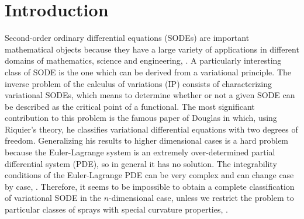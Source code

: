 \documentclass[oneside,english]{amsart}
\numberwithin{equation}{section}
\numberwithin{figure}{section}
\theoremstyle{plain}
\theoremstyle{plain}
\theoremstyle{definition}
\theoremstyle{plain}
\theoremstyle{plain}
\theoremstyle{plain}
\theoremstyle{remark}
\theoremstyle{remark}
\begin{document}
\maketitle


\section{Introduction}


Second-order ordinary differential equations (SODEs) are important
mathematical objects because they have a large variety of applications in
different domains of mathematics, science and engineering, \cite{AIM93}.  A particularly
interesting class of SODE is the one which can be derived from a variational
principle.  The inverse problem of the calculus of variations (IP) consists of
characterizing variational SODEs, which means to determine whether or not a given
SODE can be described as the critical point of a functional. The most
significant contribution to this problem is the famous paper of Douglas
\cite{Douglas41} in which, using Riquier's theory, he classifies variational
differential equations with two degrees of freedom. Generalizing his results
to higher dimensional cases is a hard problem because the Euler-Lagrange
system is an extremely over-determined partial differential system (PDE), so
in general it has no solution. The integrability conditions of the
Euler-Lagrange PDE can be very complex and can change case by case,
\cite{AT92, BM11, GM00, Krupkova97, MFLMR90, STP02}.  Therefore,
it seems to be impossible to obtain a complete classification of variational
SODE in the $n$-dimensional case, unless we restrict the problem to particular
classes of sprays with special curvature properties, \cite{Berwald41, BR04,
Bryant02, BM13, Crampin07, Shen03}. 
\end{document}
